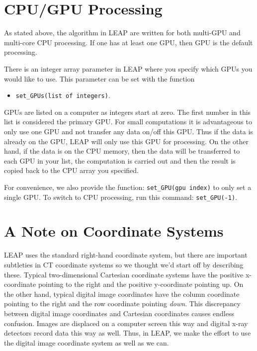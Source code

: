 \documentclass[11pt]{article}
\begin{document}
\section{CPU/GPU Processing}

As stated above, the algorithm in LEAP are written for both multi-GPU and multi-core CPU processing.  If one has at least one GPU, then GPU is the default processing.

There is an integer array parameter in LEAP where you specify which GPUs you would like to use.  This parameter can be set with the function
\begin{itemize}
\item[] \texttt{set\_GPUs(list of integers)}.
\end{itemize}
GPUs are listed on a computer as integers start at zero.  The first number in this list is considered the primary GPU.  For small computations it is advantageous to only use one GPU and not transfer any data on/off this GPU.  Thus if the data is already on the GPU, LEAP will only use this GPU for processing.  On the other hand, if the data is on the CPU memory, then the data will be transferred to each GPU in your list, the computation is carried out and then the result is copied back to the CPU array you specified.

For convenience, we also provide the function: \texttt{set\_GPU(gpu index)} to only set a single GPU.  To switch to CPU processing, run this command: \texttt{set\_GPU(-1)}.

\section{A Note on Coordinate Systems}

LEAP uses the standard right-hand coordinate system, but there are important subtleties in CT coordinate systems so we thought we'd start off by describing these.  Typical two-dimensional Cartesian coordinate systems have the positive x-coordinate pointing to the right and the positive y-coordinate pointing up.  On the other hand, typical digital image coordinates have the column coordinate pointing to the right and the row coordinate pointing \textit{down}.  This discrepancy between digital image coordinates and Cartesian coordinates causes endless confusion.  Images are displaced on a computer screen this way and digital x-ray detectors record data this way as well.  Thus, in LEAP, we make the effort to use the digital image coordinate system as well as we can.
\end{document}
